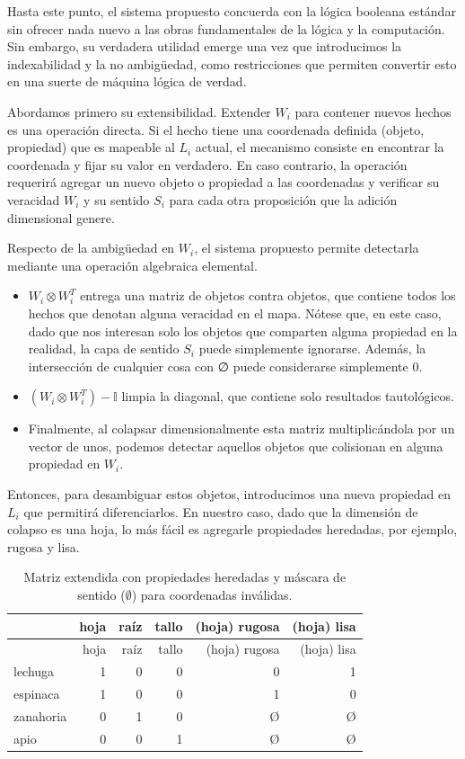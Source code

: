 \documentclass{article}
\begin{document}
Hasta este punto, el sistema propuesto concuerda con la lógica booleana
estándar sin ofrecer nada nuevo a las obras fundamentales de la lógica y
la computación. Sin embargo, su verdadera utilidad emerge una vez que
introducimos la indexabilidad y la no ambigüedad, como restricciones que
permiten convertir esto en una suerte de máquina lógica de verdad.

Abordamos primero su extensibilidad. Extender \(W_i\) para contener
nuevos hechos es una operación directa. Si el hecho tiene una coordenada
definida (objeto, propiedad) que es mapeable al \(L_i\) actual, el
mecanismo consiste en encontrar la coordenada y fijar su valor en
verdadero. En caso contrario, la operación requerirá agregar un nuevo
objeto o propiedad a las coordenadas y verificar su veracidad \(W_i\) y
su sentido \(S_i\) para cada otra proposición que la adición dimensional
genere.

Respecto de la ambigüedad en \(W_i\), el sistema propuesto permite
detectarla mediante una operación algebraica elemental.

\begin{itemize}
\item
  \(W_i \otimes W^T_i\) entrega una matriz de objetos contra objetos,
  que contiene todos los hechos que denotan alguna veracidad en el mapa.
  Nótese que, en este caso, dado que nos interesan solo los objetos que
  comparten alguna propiedad en la realidad, la capa de sentido \(S_i\)
  puede simplemente ignorarse. Además, la intersección de cualquier cosa
  con ∅ puede considerarse simplemente 0.
\item
  \((W_i \otimes W^T_i) - \mathbb{I}\) limpia la diagonal, que contiene
  solo resultados tautológicos.
\item
  Finalmente, al colapsar dimensionalmente esta matriz multiplicándola
  por un vector de unos, podemos detectar aquellos objetos que
  colisionan en alguna propiedad en \(W_i\).
\end{itemize}

Entonces, para desambiguar estos objetos, introducimos una nueva
propiedad en \(L_i\) que permitirá diferenciarlos. En nuestro caso, dado
que la dimensión de colapso es una hoja, lo más fácil es agregarle
propiedades heredadas, por ejemplo, rugosa y lisa.

\begin{longtable}[]{@{}lrrrrr@{}}
\caption{Matriz extendida con propiedades heredadas y máscara de sentido
(\(\emptyset\)) para coordenadas inválidas.}\tabularnewline
\toprule
& hoja & raíz & tallo & (hoja) rugosa & (hoja) lisa \\
\midrule
\endfirsthead
\toprule
& hoja & raíz & tallo & (hoja) rugosa & (hoja) lisa \\
\midrule
\endhead
lechuga & 1 & 0 & 0 & 0 & 1 \\
espinaca & 1 & 0 & 0 & 1 & 0 \\
zanahoria & 0 & 1 & 0 & Ø & Ø \\
apio & 0 & 0 & 1 & Ø & Ø \\
\bottomrule
\end{longtable}
\end{document}
